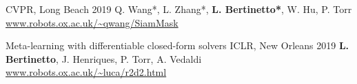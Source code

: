 \begin{cvpapers}
    {CVPR, Long Beach} %
    {2019} %
  \cvpaperauthors
    {Q. Wang*, L. Zhang*, \textbf{L. Bertinetto*}, W. Hu, P. Torr}
    {} %
    {} %
  \cvpaperurl
    {\href{http://www.robots.ox.ac.uk/~qwang/SiamMask/}{www.robots.ox.ac.uk/\textasciitilde qwang/SiamMask}}
    {} %
    {} %

  \cvpapertitle
    {Meta-learning with differentiable closed-form solvers} %
    {ICLR, New Orleans} %
    {2019} %
  \cvpaperauthors
    {\textbf{L. Bertinetto}, J. Henriques, P. Torr, A. Vedaldi}
    {} %
    {} %
  \cvpaperurl
    {\href{http://www.robots.ox.ac.uk/~luca/r2d2.html}{www.robots.ox.ac.uk/\textasciitilde luca/r2d2.html}}
    {} %
    {} %


\end{cvpapers}
